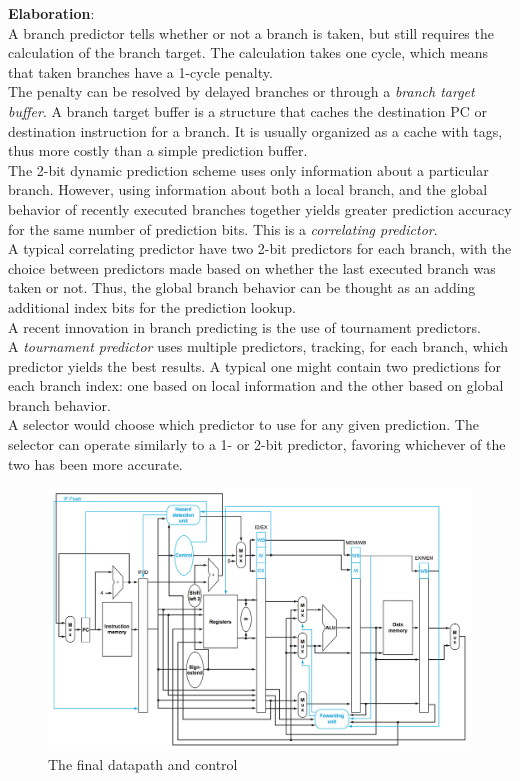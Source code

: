 \documentclass[12pt]{article}
\theoremstyle{definition}
\begin{document}
  \textbf{Elaboration}: \\
  A branch predictor tells whether or not a branch is taken, but still requires the calculation of the branch target.
  The calculation takes one cycle, which means that taken branches have a 1-cycle penalty. \\
  The penalty can be resolved by delayed branches or through a \emph{branch target buffer}.
  A branch target buffer is a structure that caches the destination PC or destination instruction for a branch.
  It is usually organized as a cache with tags, thus more costly than a simple prediction buffer.\\

  The 2-bit dynamic prediction scheme uses only information about a particular branch.
  However, using information about both a local branch, and the global behavior of recently executed branches together yields greater prediction accuracy for the same number of prediction bits.
  This is a \emph{correlating predictor}. \\
  A typical correlating predictor have two 2-bit predictors for each branch, with the choice between predictors made based on whether the last executed branch was taken or not.
  Thus, the global branch behavior can be thought as an adding additional index bits for the prediction lookup. \\

  A recent innovation in branch predicting is the use of tournament predictors. \\
  A \emph{tournament predictor} uses multiple predictors, tracking, for each branch, which predictor yields the best results.
  A typical one might contain two predictions for each branch index: one based on local information and the other based on global branch behavior. \\
  A selector would choose which predictor to use for any given prediction.
  The selector can operate similarly to a 1- or 2-bit predictor, favoring whichever of the two has been more accurate.

  \begin{figure}
  \centering
  \caption{The final datapath and control}
  \includegraphics[width=1.0\textwidth]{pictures/finalPipelineDataPath.png}
  \end{figure}
\end{document}
